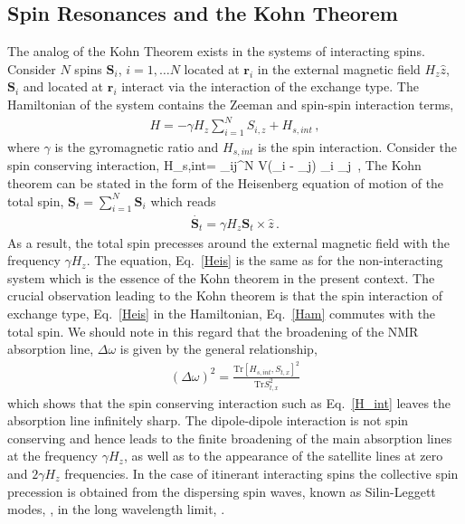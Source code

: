 \subsection{Spin Resonances and the Kohn Theorem}
The analog of the Kohn Theorem exists in the systems of interacting spins.
Consider $N$ spins $\bm{S}_i$, $i=1,\ldots N$ located at $\bm{r}_i$ in the external magnetic field $H_z\hat{z}$, $\bm{S}_i$ and located at $\bm{r}_i$ interact via the interaction of the exchange type.
The Hamiltonian of the system contains the Zeeman and spin-spin interaction terms,
\begin{align}\label{Ham}
H = - \gamma H_z  \sum_{i=1}^N  S_{i,z} + H_{s,int}\, ,
\end{align}
where $\gamma$ is the gyromagnetic ratio and $H_{s,int}$ is the spin interaction. 
Consider the spin conserving interaction,
\be\label{H_int}
H_{s,int}=  \sum_{i\neq j}^N V(_i - _j) _i \cdot {}_j\, ,
\ee
The Kohn theorem can be stated in the form of the Heisenberg equation of motion of the total spin, $\bm{S}_t = \sum_{i=1}^N \bm{S}_i$ which reads
\begin{align}\label{Heis}
\dot{\bm{S}_{t}} =  \gamma H_z \bm{S}_{t} \times \hat{z}\, .
\end{align}
As a result, the total spin precesses around the external magnetic field with the frequency $\gamma H_z$.
The equation, Eq.~\eqref{Heis} is the same as for the non-interacting system which is the essence of the Kohn theorem in the present context.
The crucial observation leading to the Kohn theorem is that the spin interaction of exchange type, Eq.~\eqref{Heis} in the Hamiltonian, Eq.~\eqref{Ham} commutes with the total spin.
We should note in this regard that the broadening of the NMR absorption line, $\Delta \omega$ is given by the general relationship, \cite{Slichter}
\begin{align}\label{broad}
(\Delta \omega)^2 = \frac{ \mathrm{Tr} [H_{s,int},S_{t,x}]^2}{ \mathrm{Tr} S_{t,x}^2 }
\end{align}
which shows that the spin conserving interaction such as Eq.~\eqref{H_int} leaves the absorption line infinitely sharp.
The dipole-dipole interaction is not spin conserving and hence leads to the finite broadening of the main absorption lines at the frequency $\gamma H_z$, as
well as to the appearance of the satellite lines at zero and $2\gamma H_z$ frequencies.
In the case of itinerant interacting spins the collective spin precession is obtained from the dispersing spin waves, known as Silin-Leggett modes, 
\cite{Silin1958},\cite{Leggett1970}
in the long wavelength limit, \cite{Pitaevskii1980}.







